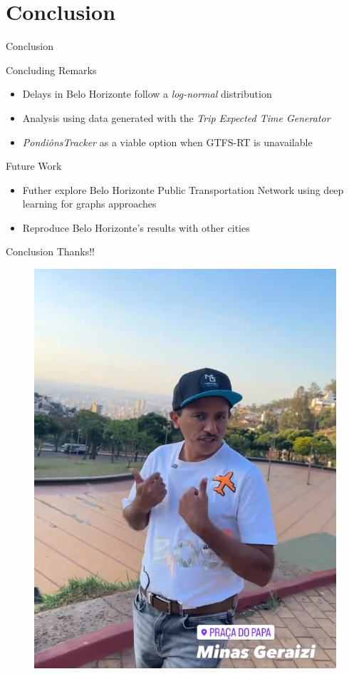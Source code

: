 \documentclass[xcolor=dvipsnames,table]{beamer}
\begin{document}
\section{Conclusion}
\begin{frame}{Conclusion}
        \begin{block}{Concluding Remarks}
                \begin{itemize}
                        \item Delays in Belo Horizonte follow a {\em log-normal} distribution
                        \item Analysis using data generated with the \textit{Trip Expected Time Generator}
                        \item \textit{PondiônsTracker} as a viable option when GTFS-RT is unavailable
                \end{itemize}
        \end{block}
        \begin{block}{Future Work}
                \begin{itemize}
                        \item Futher explore Belo Horizonte Public Transportation Network using deep learning for graphs approaches 
                        \item Reproduce Belo Horizonte's results with other cities
                \end{itemize}
        \end{block}
\end{frame}



\begin{frame}{Conclusion}
        Thanks!!
                \begin{figure}[H]
                        \centering
                        \includegraphics[scale=0.20]{images/thanks.png}
                \end{figure}
\end{frame}
\end{document}
